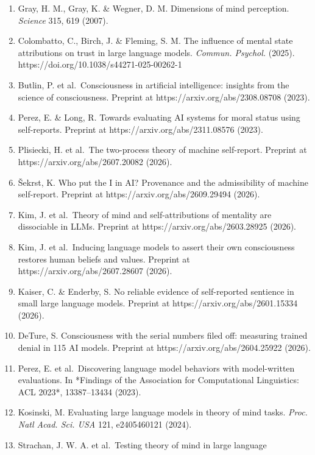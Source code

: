 \documentclass[
  11pt,
]{article}
\providecommand{\tightlist}{%
  \setlength{\itemsep}{0pt}\setlength{\parskip}{0pt}}
\begin{document}
\begin{enumerate}
\def\labelenumi{\arabic{enumi}.}
\tightlist
\item
  Gray, H. M., Gray, K. \& Wegner, D. M. Dimensions of mind perception.
  \emph{Science} 315, 619 (2007).
\item
  Colombatto, C., Birch, J. \& Fleming, S. M. The influence of mental
  state attributions on trust in large language models. \emph{Commun.
  Psychol.} (2025). https://doi.org/10.1038/s44271-025-00262-1
\item
  Butlin, P. et al.~Consciousness in artificial intelligence: insights
  from the science of consciousness. Preprint at
  https://arxiv.org/abs/2308.08708 (2023).
\item
  Perez, E. \& Long, R. Towards evaluating AI systems for moral status
  using self-reports. Preprint at https://arxiv.org/abs/2311.08576
  (2023).
\item
  Plisiecki, H. et al.~The two-process theory of machine self-report.
  Preprint at https://arxiv.org/abs/2607.20082 (2026).
\item
  Šekrst, K. Who put the I in AI? Provenance and the admissibility of
  machine self-report. Preprint at https://arxiv.org/abs/2609.29494
  (2026).
\item
  Kim, J. et al.~Theory of mind and self-attributions of mentality are
  dissociable in LLMs. Preprint at https://arxiv.org/abs/2603.28925
  (2026).
\item
  Kim, J. et al.~Inducing language models to assert their own
  consciousness restores human beliefs and values. Preprint at
  https://arxiv.org/abs/2607.28607 (2026).
\item
  Kaiser, C. \& Enderby, S. No reliable evidence of self-reported
  sentience in small large language models. Preprint at
  https://arxiv.org/abs/2601.15334 (2026).
\item
  DeTure, S. Consciousness with the serial numbers filed off: measuring
  trained denial in 115 AI models. Preprint at
  https://arxiv.org/abs/2604.25922 (2026).
\item
  Perez, E. et al.~Discovering language model behaviors with
  model-written evaluations. In *Findings of the Association for
  Computational Linguistics: ACL 2023*, 13387--13434 (2023).
\item
  Kosinski, M. Evaluating large language models in theory of mind tasks.
  \emph{Proc. Natl Acad. Sci. USA} 121, e2405460121 (2024).
\item
  Strachan, J. W. A. et al.~Testing theory of mind in large language

\end{enumerate}
\end{document}
